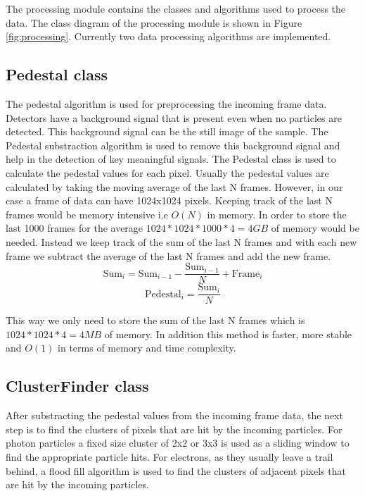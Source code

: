 \begin{spacing}{1.2}
    The processing module contains the classes and algorithms used to process the data.
    The class diagram of the processing module is shown in Figure \ref{fig:processing}.
    Currently two data processing algorithms are implemented.

    \subsection{Pedestal class}

    The pedestal algorithm is used for preprocessing the incoming frame data. Detectors have a
    background signal that is present even when no particles are detected. This background signal
    can be the still image of the sample. The Pedestal substraction algorithm is used to remove
    this background signal and help in the detection of key meaningful signals. The Pedestal class
    is used to calculate the pedestal values for each pixel. Usually the pedestal values are
    calculated by taking the moving average of the last N frames. However, in our case a frame of data
    can have 1024x1024 pixels. Keeping track of the last N frames would be memory intensive i.e
    $O(N)$ in memory.
    In order to store the last 1000 frames for the average $1024*1024*1000*4 = 4GB$  of memory would be needed.
    Instead we keep track of the sum of the last N frames and with each new frame we subtract the
    average of the last N frames and add the new frame.
    \begin{equation}
        \text{Sum}_i = \text{Sum}_{i-1} - \frac{\text{Sum}_{i-1}}{N} + \text{Frame}_i
    \end{equation}
    \begin{equation}
        \text{Pedestal}_i = \frac{\text{Sum}_i}{N}
    \end{equation}

    This way we only need to store the sum of the last N frames
    which is $1024*1024*4 = 4MB$ of memory.  In addition this method is faster, more stable
    and $O(1)$ in terms of memory and time complexity.


    \subsection{ClusterFinder class}
    After substracting the pedestal values from the incoming frame data, the next step is to
    find the clusters of pixels that are hit by the incoming particles. For photon particles
    a fixed size cluster of 2x2 or 3x3 is used as a sliding window to find the appropriate   particle hits.
    For electrons, as they usually leave a trail behind, a flood fill algorithm is used to find the
    clusters of adjacent pixels that are hit by the incoming particles.\\



\end{spacing}
